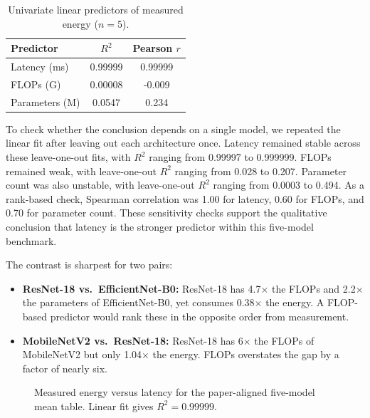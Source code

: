 \documentclass[conference]{IEEEtran}
\begin{document}
\begin{table}[ht]
\centering
\caption{Univariate linear predictors of measured energy ($n = 5$).}
\label{tab:predictors}
\begin{tabular}{l c c}
\toprule
Predictor & $R^2$ & Pearson $r$ \\
\midrule
Latency (ms) & 0.99999 & 0.99999 \\
FLOPs (G) & 0.00008 & -0.009 \\
Parameters (M) & 0.0547 & 0.234 \\
\bottomrule
\end{tabular}
\end{table}

To check whether the conclusion depends on a single model, we repeated the
linear fit after leaving out each architecture once. Latency remained stable
across these leave-one-out fits, with $R^2$ ranging from 0.99997 to 0.999999.
FLOPs remained weak, with leave-one-out $R^2$ ranging from 0.028 to 0.207.
Parameter count was also unstable, with leave-one-out $R^2$ ranging from
0.0003 to 0.494. As a rank-based check, Spearman correlation was 1.00 for
latency, 0.60 for FLOPs, and 0.70 for parameter count. These sensitivity
checks support the qualitative conclusion that latency is the stronger
predictor within this five-model benchmark.

The contrast is sharpest for two pairs:
\begin{itemize}
\item \textbf{ResNet-18 vs.\ EfficientNet-B0:} ResNet-18 has 4.7$\times$ the
FLOPs and 2.2$\times$ the parameters of EfficientNet-B0, yet consumes
0.38$\times$ the energy. A FLOP-based predictor would rank these in the
opposite order from measurement.
\item \textbf{MobileNetV2 vs.\ ResNet-18:} ResNet-18 has 6$\times$ the FLOPs
of MobileNetV2 but only 1.04$\times$ the energy. FLOPs overstates the gap by a
factor of nearly six.
\end{itemize}

\begin{figure}[ht]
\centering
{}
\caption{Measured energy versus latency for the paper-aligned five-model mean table. Linear fit gives $R^2 = 0.99999$.}
\label{fig:energy-vs-latency}
\end{figure}
\end{document}
